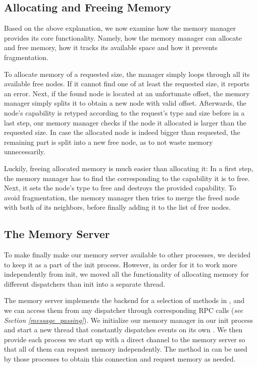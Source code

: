 \subsection{Allocating and Freeing Memory}
Based on the above explanation, we now examine how the memory manager provides its core functionality. Namely, how the memory manager can allocate and free memory, how it tracks its available space and how it prevents fragmentation.

To allocate memory of a requested size, the manager simply loops through all its available free nodes. If it cannot find one of at least the requested size, it reports an error. Next, if the found node is located at an unfortunate offset, the memory manager simply splits it to obtain a new node with valid offset. Afterwards, the node's capability is retyped according to the request's type and size before in a last step, our memory manager checks if the node it allocated is larger than the requested size. In case the allocated node is indeed bigger than requested, the remaining part is split into a new free node, as to not waste memory unnecessarily.

Luckily, freeing allocated memory is much easier than allocating it: In a first step, the memory manager has to find the  corresponding to the capability it is to free. Next, it sets the node's type to free and destroys the provided capability. To avoid fragmentation, the memory manager then tries to merge the freed node with both of its neighbors, before finally adding it to the list of free nodes.

\subsection{The Memory Server}
To make finally make our memory server available to other processes, we decided to keep
it as a part of the init process. However, in order for it to work more independently
from init, we moved all the functionality of allocating memory for different dispatchers
than init into a separate thread.

The memory server implements the backend for a selection of methods in , and we can access them from any dispatcher through corresponding RPC calls (\emph{see Section \ref{message_passing}}). We initialize our memory manager in our init process and start a new thread that constantly dispatches events on its own . We then provide each process we start up with a direct channel to the memory server so that all of them can request memory independently. The method  in  can be used by those processes to obtain this connection and request memory as needed.

